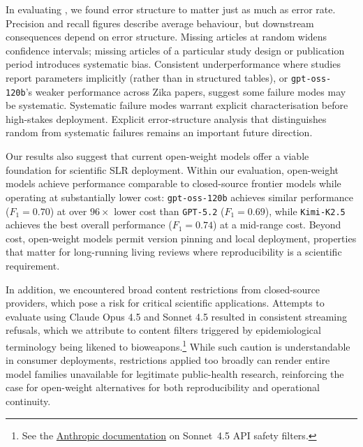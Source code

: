 In evaluating \name{}, we found error structure to matter just as much as error rate. Precision and recall figures describe average behaviour, but downstream consequences depend on error structure. Missing articles at random widens confidence intervals; missing articles of a particular study design or publication period introduces systematic bias. Consistent underperformance where studies report parameters implicitly (rather than in structured tables), or \texttt{gpt-oss-120b}'s weaker performance across Zika papers, suggest some failure modes may be systematic. Systematic failure modes warrant explicit characterisation before high-stakes deployment. Explicit error-structure analysis that distinguishes random from systematic failures remains an important future direction.



Our results also suggest that current open-weight models offer a viable foundation for scientific SLR deployment. Within our evaluation, open-weight models achieve performance comparable to closed-source frontier models while operating at substantially lower cost: \texttt{gpt-oss-120b} achieves similar performance ($F_1 = 0.70$) at over $96\times$ lower cost than \texttt{GPT-5.2} ($F_1 = 0.69$), while \texttt{Kimi-K2.5} achieves the best overall performance ($F_1 = 0.74$) at a mid-range cost. Beyond cost, open-weight models permit version pinning and local deployment, properties that matter for long-running living reviews where reproducibility is a scientific requirement.

In addition, we encountered broad content restrictions from closed-source providers, which pose a risk for critical scientific applications. Attempts to evaluate \name{} using Claude Opus 4.5 and Sonnet 4.5 resulted in consistent streaming refusals, which we attribute to content filters triggered by epidemiological terminology being likened to bioweapons.\footnote{See the \href{https://support.claude.com/en/articles/12449294-understanding-sonnet-4-5-s-api-safety-filters}{Anthropic documentation} on Sonnet~4.5 API safety filters.} While such caution is understandable in consumer deployments, restrictions applied too broadly can render entire model families unavailable for legitimate public-health research, reinforcing the case for open-weight alternatives for both reproducibility and operational continuity.

